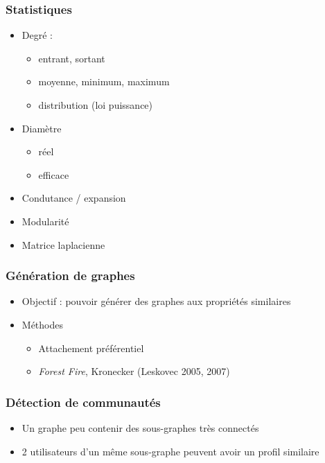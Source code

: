 \documentclass[c]{beamer}
\begin{document}
\begin{frame}
    \frametitle{Statistiques}

    \begin{itemize}
        \item Degré :
            \begin{itemize}
                \item entrant, sortant
                \item moyenne, minimum, maximum
                \item distribution (loi puissance)
            \end{itemize}
        \item Diamètre
            \begin{itemize}
                \item réel
                \item efficace
            \end{itemize}
        \item Condutance / expansion
        \item Modularité
        \item Matrice laplacienne
    \end{itemize}
\end{frame}

\begin{frame}
    \frametitle{Génération de graphes}

    \begin{itemize}
        \item Objectif : pouvoir générer des graphes aux propriétés similaires
        \item Méthodes
            \begin{itemize}
                \item Attachement préférentiel
                \item \textit{Forest Fire}, Kronecker (Leskovec 2005, 2007)
            \end{itemize}
    \end{itemize}
\end{frame}

\begin{frame}
    \frametitle{Détection de communautés}

    \begin{itemize}
        \item Un graphe peu contenir des sous-graphes très connectés
        \item 2 utilisateurs d'un même sous-graphe peuvent avoir un profil
            similaire
    \end{itemize}
\end{frame}
\end{document}
